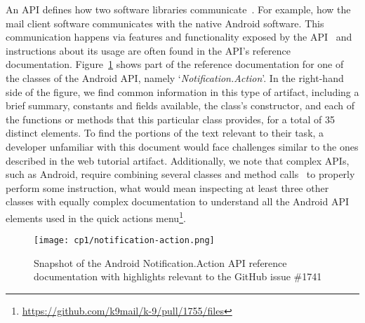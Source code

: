 An \acf{API} defines how  two software libraries communicate~\cite{robillard2011field}.
For example, how the mail client software communicates 
with the native Android software. This communication happens via features and functionality exposed by the API~\cite{Robillard2015} 
and instructions about its usage are often found in the API's reference documentation.
Figure~\ref{fig:api-notification-action} shows part of the reference documentation for one of the classes of the Android API, namely `\textit{Notification.Action}'. 
In the right-hand side of the figure, we find common 
information in this type of artifact, including a brief summary,
constants and fields available, the class's constructor, and 
each of the functions or methods that this particular class provides,  
for a total of 35 distinct elements.
To find the portions of the text relevant to
their task,
a developer unfamiliar with this document would 
face challenges similar to the ones  described in the web tutorial artifact. Additionally, 
we note that complex APIs, 
such as Android, require combining several classes
and method calls~\cite{robillard2011field} to properly perform some instruction,
what would mean inspecting at least three other classes 
with equally complex documentation
to understand all the Android API elements used in the quick actions menu\footnote{\url{https://github.com/k9mail/k-9/pull/1755/files}}.





\begin{figure}
    \centering
    \texttt{[image: cp1/notification-action.png]}
    \caption{Snapshot of the Android Notification.Action API reference documentation with highlights relevant to the GitHub issue \#1741}
    \label{fig:api-notification-action}
\end{figure}




